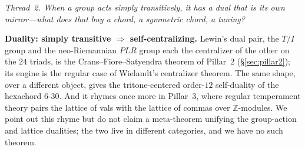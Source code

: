 \documentclass[11pt]{article}
\newcommand{\question}[1]{\smallskip\noindent\textit{#1}\smallskip}
\begin{document}
\question{Thread~2. When a group acts simply transitively, it has a dual that is its own
mirror---what does that buy a chord, a symmetric chord, a tuning?}

\noindent\textbf{Duality: simply transitive $\Rightarrow$ self-centralizing.} Lewin's dual pair,
the $T/I$ group and the neo-Riemannian $PLR$ group each the centralizer of the other on the $24$
triads, is the Crans--Fiore--Satyendra theorem of Pillar~2 (\S\ref{sec:pillar2}); its engine is
the regular case of Wielandt's centralizer theorem. The same shape, over a different object,
gives the tritone-centered order-$12$ self-duality of the hexachord $6$-$30$. And it rhymes once
more in Pillar~3, where regular temperament theory pairs the lattice of vals with the lattice of
commas over $\mathbb{Z}$-modules. We point out this rhyme but do not claim a meta-theorem
unifying the group-action and lattice dualities; the two live in different categories, and we
have no such theorem.
\end{document}
